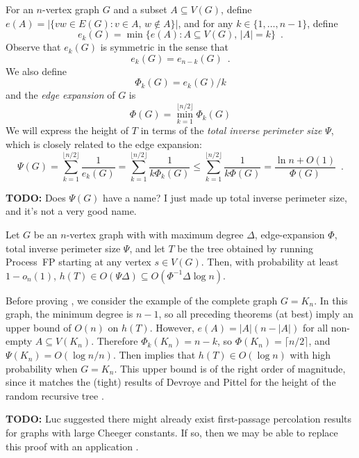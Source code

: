 \documentclass[lotsofwhite]{patmorin}
\begin{document}
For an $n$-vertex graph $G$ and a subset $A\subseteq V(G)$,
define $e(A)=|\{vw\in E(G): v\in A,\, w\not\in A\}|$, and for any
$k\in\{1,\ldots,n-1\}$, define
\[
    e_k(G) = \min\{e(A) : A\subseteq V(G),\, |A|=k \} \enspace .
\]
Observe that $e_k(G)$ is symmetric in the sense that
\[
    e_k(G) = e_{n-k}(G) \enspace .
\]
We also define
\[
    \Phi_k(G) = e_k(G)/k
\]
and the \emph{edge expansion} of $G$ is
\[
    \Phi(G) = \min_{k=1}^{\lfloor n/2\rfloor}\Phi_k(G)
\]
We will express the height of $T$ in terms of the \emph{total inverse
perimeter size} $\Psi$, which is closely related to the edge expansion:
\[
    \Psi(G) = \sum_{k=1}^{\lfloor n/2\rfloor} \frac{1}{e_k(G)} 
            = \sum_{k=1}^{\lfloor n/2\rfloor} \frac{1}{k\Phi_k(G)}
            \le \sum_{k=1}^{\lfloor n/2\rfloor} \frac{1}{k\Phi(G)}
            = \frac{\ln n +O(1)}{\Phi(G)} \enspace .
\]

\textbf{TODO:} Does $\Psi(G)$ have a name?  I just made up total
inverse perimeter size, and it's not a very good name.

\begin{thm}
  Let $G$ be an $n$-vertex graph with with maximum degree $\Delta$,
  edge-expansion $\Phi$, total inverse perimeter size $\Psi$,
  and let $T$ be the tree obtained by running Process~FP starting at
  any vertex $s\in V(G)$.  Then, with probability at least $1-o_n(1)$,
  $h(T) \in O(\Psi\Delta)\subseteq O(\Phi^{-1}\Delta\log n)$.
\end{thm}

Before proving , we
consider the example of the complete graph $G=K_n$.  In this graph,
the minimum degree is $n-1$, so all preceding theorems (at best)
imply an upper bound of $O(n)$ on $h(T)$.  However, $e(A)=|A|(n-|A|)$
for all non-empty $A\subseteq V(K_n)$. Therefore $\Phi_k(K_n) = n-k$,
so $\Phi(K_n) = \lceil n/2\rceil$, and $\Psi(K_n) = O(\log n/n)$.
Then  implies that $h(T)\in
O(\log n)$ with high probability when $G=K_n$.  This upper bound
is of the right order of magnitude, since it matches the (tight) results
of Devroye and Pittel for the height of the random recursive tree
\cite{devroye:branching,pittel:note}.

\textbf{TODO:} Luc suggested there might already exist first-passage
percolation results for graphs with large Cheeger constants.  If so,
then we may be able to replace this proof with an application
.
\end{document}
